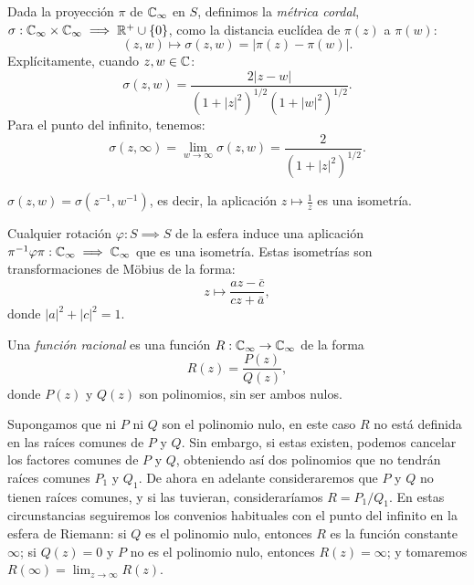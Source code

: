 \begin{definicion}
  Dada la proyección $\pi$ de $\mathbb{C}_\infty$ en $S$, definimos la \emph{métrica
  cordal}, $\sigma : \mathbb{C}_\infty \times \mathbb{C}_\infty \implies \mathbb{R}^+ \cup \{0\}$, como la
  distancia euclídea de $\pi(z)$ a $\pi(w)$:
  \begin{equation*}
    (z,w) \mapsto \sigma(z,w) = |\pi(z) - \pi(w)|.
  \end{equation*}
  Explícitamente, cuando $z, w \in \mathbb{C}$:
  \begin{equation*}
    \sigma(z,w) = \frac{2|z-w|}{(1+|z|^2)^{1/2}(1+|w|^2)^{1/2}}.
  \end{equation*}
  Para el punto del infinito, tenemos:
  \begin{equation*}
    \sigma(z,\infty) = \lim_{w \to \infty} \sigma(z,w) = \frac{2}{(1+|z|^2)^{1/2}}.
  \end{equation*}
\end{definicion}

\begin{observacion}
  $\sigma(z,w) = \sigma(z^{-1}, w^{-1})$, es decir, la aplicación $z \mapsto
  \frac{1}{z}$ es una isometría.
\end{observacion}

\begin{observacion}
  Cualquier rotación $\varphi: S \implies S$ de la esfera induce una aplicación
  $\pi^{-1} \varphi \pi : \mathbb{C}_\infty \implies \mathbb{C}_\infty$ que es una isometría. Estas
  isometrías son transformaciones de Möbius de la forma:
  \begin{equation*}
    z \mapsto \frac{a z - \bar{c}}{c z + \bar{a}},
  \end{equation*}
  donde $|a|^2 + |c|^2 = 1$.
\end{observacion}

\begin{definicion}
  Una \emph{función racional} es una función $R: \mathbb{C}_\infty \to \mathbb{C}_\infty$ de la forma
  \begin{equation*}
    R(z) = \frac{P(z)}{Q(z)},
  \end{equation*}
  donde $P(z)$ y $Q(z)$ son polinomios, sin ser ambos nulos.
\end{definicion}

Supongamos que ni $P$ ni $Q$ son el polinomio nulo, en este caso $R$ no está
definida en las raíces comunes de $P$ y $Q$. Sin embargo, si estas existen,
podemos cancelar los factores comunes de $P$ y $Q$, obteniendo así dos
polinomios que no tendrán raíces comunes $P_1$ y $Q_1$. De ahora en adelante
consideraremos que $P$ y $Q$ no tienen raíces comunes, y si las tuvieran,
consideraríamos $R = P_1 / Q_1$. En estas circunstancias seguiremos los
convenios habituales con el punto del infinito en la esfera de Riemann: si $Q$
es el polinomio nulo, entonces $R$ es la función constante $\infty$; si $Q(z) =
0$ y $P$ no es el polinomio nulo, entonces $R(z) = \infty$; y tomaremos
$R(\infty) = \lim_{z \to \infty} R(z)$.

